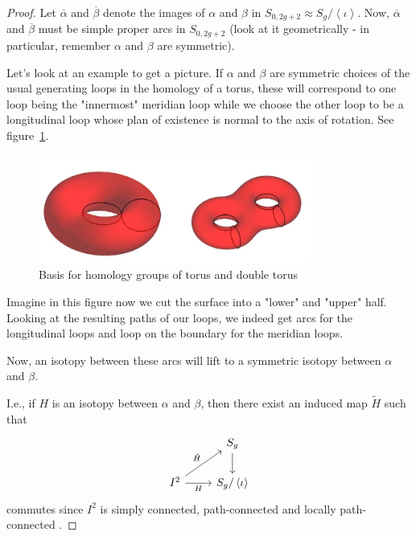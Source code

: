 \documentclass[reqno]{amsart}
\theoremstyle{definition}
\theoremstyle{remark}
\begin{document}
   \begin{proof}
       Let $\overline{\alpha}$ and $\overline{\beta}$ 
       denote the images of $\alpha$ and $\beta$ 
       in $S_{0,2g+2}\approx S_g / \left<\iota \right>$.
       Now,
       $ \overline{\alpha}$ and $ \overline{\beta}$
       must be simple proper arcs in $S_{0,2g+2}$ (look
       at it geometrically - in particular, remember $\alpha$ and
       $\beta$ are symmetric).

       Let's look at an example to get a picture. If
       $\alpha$ and $\beta$ are symmetric choices of the
       usual generating loops in the homology of a torus, these
       will correspond to one loop being the
       "innermost" meridian loop while we choose the
       other loop to be a longitudinal loop
       whose plan of existence is
       normal to the axis of rotation. See
       figure~\ref{fig:homology-basis-of-torus-and-double-torus-png}.

       \begin{figure}[htpb]
           \centering
           \includegraphics[width=0.8\textwidth]{homology-basis-of-torus-and-double-torus.png}
           \caption{Basis for homology groups of torus and
           double torus}
           \label{fig:homology-basis-of-torus-and-double-torus-png}
       \end{figure}
       Imagine in this figure now we cut the surface into a "lower"
       and "upper" half. Looking at the resulting paths of
       our loops, we indeed get arcs for the longitudinal loops
       and loop on the boundary for the meridian loops.




       
       Now, an isotopy between
       these arcs will lift to a symmetric isotopy
       between $\alpha$ and $\beta$.


       I.e., if
       $H$ is an isotopy between $\alpha$ and $\beta$, then
       there exist an induced map $\tilde{H}$ such that
       \begin{equation*}
       \begin{tikzcd}
           & S_g \ar[d] \\
           I^2 \ar[ru, "\tilde{H}"] \ar[r, "H"'] &
           S_g / \left<\iota \right>
       \end{tikzcd}
       \end{equation*}
       commutes since $I^2$ is simply connected,
       path-connected and locally path-connected
       \cite[Cor~4.2]{Bredon}.
       

\end{proof}
\end{document}
